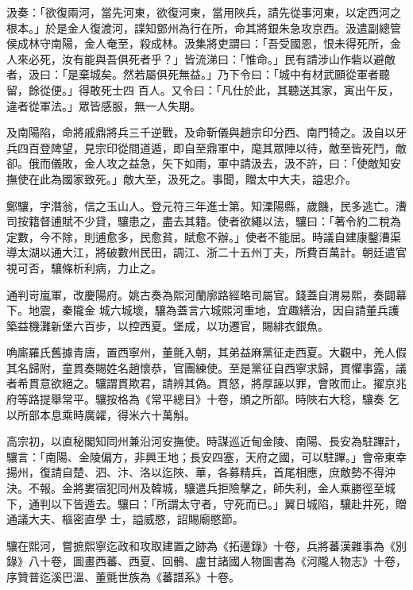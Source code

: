 \begin{pinyinscope}
 汲奏：「欲復兩河，當先河東，欲復河東，當用陜兵，請先從事河東，以定西河之根本。」於是金人復渡河，諜知鄧州為行在所，命其將銀朱急攻京西。汲遣副總管侯成林守南陽，金人奄至，殺成林。汲集將吏謂曰：「吾受國恩，恨未得死所，金人來必死，汝有能與吾俱死者乎？」皆流涕曰：「惟命。」民有請涉山作砦以避敵者，汲曰：「是棄城矣。然若屬俱死無益。」乃下令曰：「城中有材武願從軍者聽留，餘從便。」得敢死士四
 百人。又令曰：「凡仕於此，其聽送其家，寅出午反，違者從軍法。」眾皆感服，無一人失期。



 及南陽陷，命將戚鼎將兵三千逆戰，及命靳儀與趙宗印分西、南門犄之。汲自以牙兵四百登陴望，見宗印從間道遁，即自至鼎軍中，麾其眾陣以待，敵至皆死鬥，敵卻。俄而儀敗，金人攻之益急，矢下如雨，軍中請汲去，汲不許，曰：「使敵知安撫使在此為國家致死。」敵大至，汲死之。事聞，贈太中大夫，謚忠介。



 鄭驤，字潛翁，信之玉山人。登元符三年進士第。知溧陽縣，歲饑，民多逃亡。漕司按籍督逋賦不少貸，驤患之，盡去其籍。使者欲繩以法，驤曰：「著令約二稅為定數，今不除，則逋愈多，民愈貧，賦愈不辦。」使者不能屈。時議自建康鑿漕渠導太湖以通大江，將破數州民田，調江、浙二十五州丁夫，所費百萬計。朝廷遣官視可否，驤條析利病，力止之。



 通判岢嵐軍，改慶陽府。姚古奏為熙河蘭廓路經略司屬官。錢蓋自渭易熙，奏闢幕下。地震，秦隴金
 城六城壞，驤為蓋言六城熙河重地，宜趣繕治，因自請董兵護築益機灘新堡六百步，以控西夏。堡成，以功遷官，賜緋衣銀魚。



 唃廝羅氏舊據青唐，置西寧州，董氈入朝，其弟益麻黨征走西夏。大觀中，羌人假其名歸附，童貫奏賜姓名趙懷恭，官團練使。至是黨征自西寧求歸，貫懼事露，議者希貫意欲絕之。驤謂貫欺君，請辨其偽。貫怒，將厚誣以罪，會敗而止。擢京兆府等路提舉常平。驤按格為《常平總目》十卷，頒之所部。時陜右大稔，驤奏
 乞以所部本息乘時廣糴，得米六十萬斛。



 高宗初，以直秘閣知同州兼沿河安撫使。時謀巡近甸金陵、南陽、長安為駐蹕計，驤言：「南陽、金陵偏方，非興王地；長安四塞，天府之國，可以駐蹕。」會帝東幸揚州，復請自楚、泗、汴、洛以迄陜、華，各募精兵，首尾相應，庶敵勢不得沖決。不報。金將婁宿犯同州及韓城，驤遣兵拒險擊之，師失利，金人乘勝徑至城下，通判以下皆遁去。驤曰：「所謂太守者，守死而已。」翼日城陷，驤赴井死，贈通議大夫、樞密直學
 士，謚威愍，詔賜廟愍節。



 驤在熙河，嘗摭熙寧迄政和攻取建置之跡為《拓邊錄》十卷，兵將蕃漢雜事為《別錄》八十卷，圖畫西蕃、西夏、回鶻、盧甘諸國人物圖書為《河隴人物志》十卷，序贊普迄溪巴溫、董氈世族為《蕃譜系》十卷。




\end{pinyinscope}
